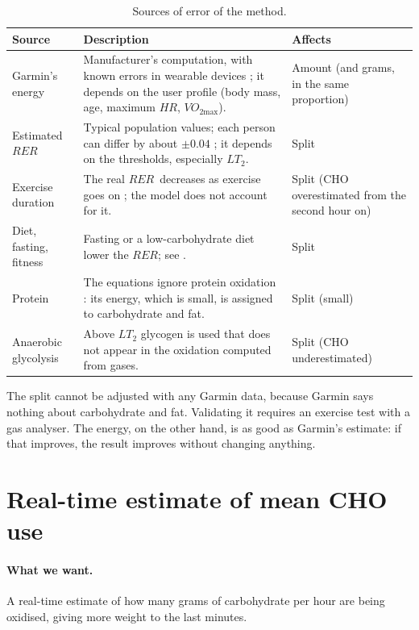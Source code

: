 \documentclass[10pt,a4paper]{article}
\newcommand{\smax}{{\scriptscriptstyle\text{max}}}
\newcommand{\VOmax}{\ensuremath{\mathit{VO}_{2\smax}}}
\newcommand{\RER}{\ensuremath{\mathit{RER}}}
\newcommand{\FC}{\ensuremath{\mathit{HR}}}
\begin{document}
\begin{table}[H]
\centering
\caption{Sources of error of the method.}
\label{tab:errors}
\small
\begin{tabularx}{\textwidth}{@{}>{\raggedright\arraybackslash}p{3.6cm} L >{\raggedright\arraybackslash}p{2.4cm}@{}}
\toprule
Source & Description & Affects \\
\midrule
Garmin's energy & Manufacturer's computation, with known errors in wearable devices
\citep{shcherbina2017,fuller2020}; it depends on the user profile (body mass, age,
maximum \FC, $\VOmax$). & Amount (and grams, in the same proportion) \\
Estimated \RER & Typical population values; each person can differ by about $\pm0.04$
\citep{goedecke2000}; it depends on the thresholds, especially $LT_2$. & Split \\
Exercise duration & The real \RER\ decreases as exercise goes on
\citep{rothschild2022}; the model does not account for it. & Split (CHO overestimated
from the second hour on) \\
Diet, fasting, fitness & Fasting or a low-carbohydrate diet lower the \RER; see
\citep{chofatfc2026}. & Split \\
Protein & The equations ignore protein oxidation \citep{frayn1983,jeukendrup2005}: its
energy, which is small, is assigned to carbohydrate and fat. & Split (small) \\
Anaerobic glycolysis & Above $LT_2$ glycogen is used that does not appear in the oxidation
computed from gases. & Split (CHO underestimated) \\
\bottomrule
\end{tabularx}
\end{table}

The split cannot be adjusted with any Garmin data, because Garmin says nothing about
carbohydrate and fat. Validating it requires an exercise test with a gas analyser. The
energy, on the other hand, is as good as Garmin's estimate: if that improves, the result
improves without changing anything.

\section{Real-time estimate of mean CHO use}\label{sec:implementacio}

\paragraph{What we want.} A real-time estimate of how many grams of carbohydrate per hour
are being oxidised, giving more weight to the last minutes.
\end{document}
